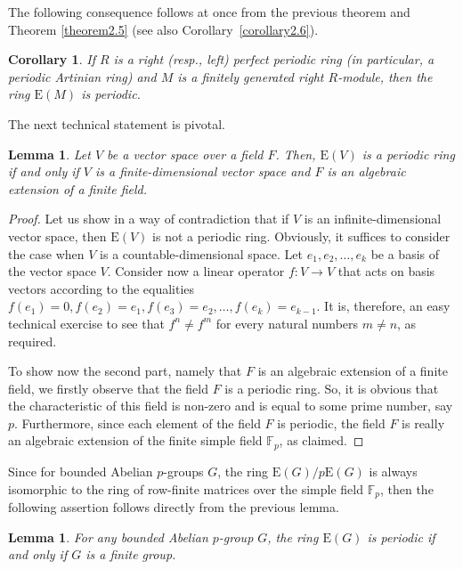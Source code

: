 \documentclass[12pt]{amsart}
\newtheorem{cor}[thm]{Corollary}
\newtheorem{lem}[thm]{Lemma}
\theoremstyle{definition}
\theoremstyle{remark}
\numberwithin{equation}{section}
\begin{document}
The following consequence follows at once from the previous theorem and Theorem \ref{theorem2.5} (see also Corollary~\ref{corollary2.6}).

\begin{cor}
If $R$ is a right (resp., left) perfect periodic ring (in particular, a periodic Artinian ring) and $M$ is a finitely generated right $R$-module, then the ring $\mathrm{E}(M)$ is periodic.
\end{cor}

The next technical statement is pivotal.

\begin{lem}
Let $V$ be a vector space over a field $F$. Then, $\mathrm{E}(V)$ is a periodic ring if and only if $V$ is a finite-dimensional vector space and $F$ is an algebraic extension of a finite field.
\end{lem}

\begin{proof}
Let us show in a way of contradiction that if $V$ is an infinite-dimensional vector space, then $\mathrm{E}(V)$ is not a periodic ring. Obviously, it suffices to consider the case when $V$ is a countable-dimensional space. Let $e_1, e_2, \ldots, e_k$ be a basis of the vector space $V$. Consider now a linear operator $f:V\to V$ that acts on basis vectors according to the equalities $f(e_1)=0, f(e_2)=e_1, f(e_3)=e_2, \ldots , f(e_k)=e_{k-1}$. It is, therefore, an easy technical exercise to see that $f^n\neq f ^m$ for every natural numbers $m\neq n$, as required.

To show now the second part, namely that $F$ is an algebraic extension of a finite field, we firstly observe that the field $F$ is a periodic ring. So, it is obvious that the characteristic of this field is non-zero and is equal to some prime number, say $p$.  Furthermore, since each element of the field $F$ is periodic, the field $F$ is really an algebraic extension of the finite simple field
$\mathbb{F}_p$, as claimed.
\end{proof}

Since for bounded Abelian $p$-groups $G$, the ring $\mathrm{E}(G)/p\mathrm{E}(G)$ is always isomorphic to the ring of row-finite matrices over the simple field $\mathbb{F}_p$, then the following assertion follows directly from the previous lemma.

\begin{lem} \label{lemma3.10}
For any bounded Abelian $p$-group $G$, the ring $\mathrm{E}(G)$ is periodic if and only if $G$ is a finite group.
\end{lem}
\end{document}
